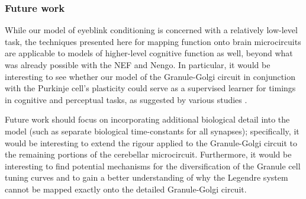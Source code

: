 \subsubsection{Future work}
While our model of eyeblink conditioning is concerned with a relatively low-level task, the techniques presented here for mapping function onto brain microcircuits are applicable to models of higher-level cognitive function as well, beyond what was already possible with the NEF and Nengo.
In particular, it would be interesting to see whether our model of the Granule-Golgi circuit in conjunction with the Purkinje cell's plasticity could serve as a supervised learner for timings in cognitive and perceptual tasks, as suggested by various studies \citep{oreilly2008cerebellum,e2014metaanalysis,sanger2020expansion}.

Future work should focus on incorporating additional biological detail into the model (such as separate biological time-constants for all synapses); specifically, it would be interesting to extend the rigour applied to the Granule-Golgi circuit to the remaining portions of the cerebellar microcircuit.
Furthermore, it would be interesting to find potential mechanisms for the diversification of the Granule cell tuning curves and to gain a better understanding of why the Legendre system cannot be mapped exactly onto the detailed Granule-Golgi circuit.